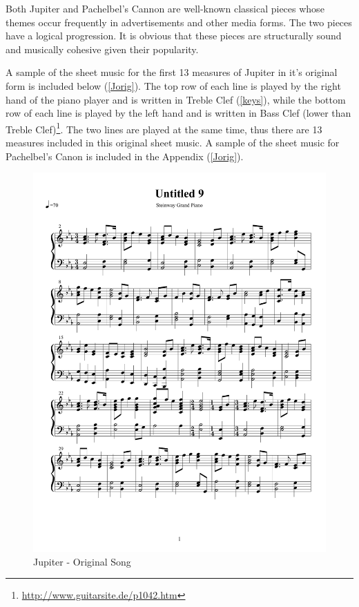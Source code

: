 \documentclass{article} %
\begin{document}
Both Jupiter and Pachelbel's Cannon are well-known classical pieces whose themes occur frequently in advertisements and other media forms. The two pieces have a logical progression. It is obvious that these pieces are structurally sound and musically cohesive given their popularity. 

 A sample of the sheet music for the first 13 measures of Jupiter in it's original form is included below (\autoref{Jorig}).  The top row of each line is played by the right hand of the piano player and is written in Treble Clef (\autoref{keys}), while the bottom row of each line is played by the left hand and is written in Bass Clef  (lower than Treble Clef)\footnote{\url{http://www.guitarsite.de/p1042.htm}}. The two lines are played at the same time, thus there are 13 measures included in this original sheet music.  A sample of the sheet music for Pachelbel's Canon is included in the Appendix (\autoref{Jorig}).
 

 
 
 \begin{figure}[H]
\centering

\includegraphics [scale = 0.6] {JupiterOriginal-cropped.pdf}
\caption{Jupiter - Original Song\label{Jorig}}
\end{figure}
\end{document}
